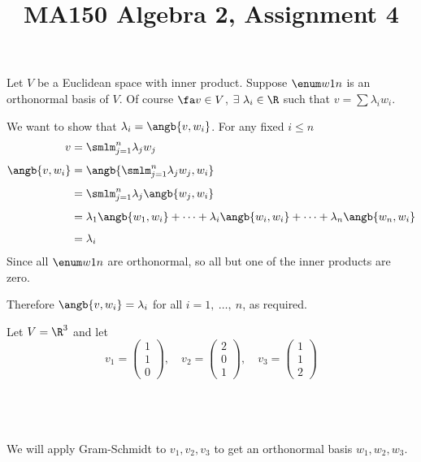 \documentclass[a4paper]{article}
\title{MA150 Algebra 2, Assignment 4}
\begin{document}
\maketitle

\setlength{\parindent}{0em}
\setlength{\parskip}{1em}


Let $V$ be a Euclidean space with inner product. Suppose $\enum w1n$ is an orthonormal basis of $V$. Of course $\fa v \in V$, $\exists\ \lambda_i \in \R$ such that $v = \sum \lambda_i w_i$.

We want to show that $\lambda_i = \angb{v, w_i}$. For any fixed $i \le n$ \begin{align*}
v &= \smlm_{j=1}^n \lambda_j w_j\\[1ex]
\angb{v, w_i} &= \angb{\smlm_{j=1}^n \lambda_j w_j, w_i}\\[1ex]
&= \smlm_{j=1}^n \lambda_j \angb{w_j, w_i}\\[1ex]
&= \lambda_1 \angb{w_1, w_i} + \cdots + \lambda_i \angb{w_i, w_i} + \cdots + \lambda_n \angb{w_n, w_i}\\[1ex]
&= \lambda_i
\end{align*}
Since all $\enum w1n$ are orthonormal, so all but one of the inner products are zero.

Therefore $\angb{v, w_i} = \lambda_i$ for all $i = 1,\ \ldots,\ n$, as required.


Let $V = \R^3$ and let $$v_1 = \begin{pmatrix}1\\ 1\\ 0\end{pmatrix}, \quad v_2 = \begin{pmatrix}2\\ 0\\ 1\end{pmatrix}, \quad v_3 = \begin{pmatrix}1\\ 1\\ 2\end{pmatrix}$$

\subsection{~}

We will apply Gram-Schmidt to $v_1, v_2, v_3$ to get an orthonormal basis $w_1, w_2, w_3$.
\end{document}
